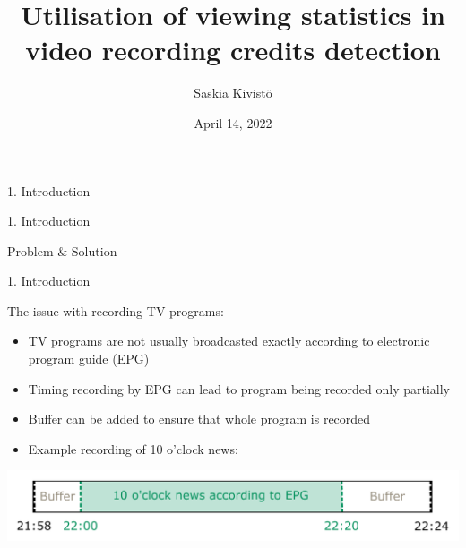 \documentclass[first=orange,second=blue,logo=blueque]{aaltoslides}
\title{Utilisation of viewing statistics in video recording credits detection}
\author[S. Kivistö]{Saskia Kivistö}
\institute[ICS]{Bachelor's thesis presentation}
\date{April 14, 2022}
\begin{document}

\aaltotitleframe


\begin{frame}{1. Introduction}
\end{frame}


\begin{frame}{1. Introduction}
    \begin{block}{{Problem {\color{black}\&} \alert{Solution }}}
    \end{block}
\end{frame}


\begin{frame}{1. Introduction}
    \begin{block}{{\color{black}The issue with recording TV programs:}}
        \begin{itemize}
            \item TV programs are not usually broadcasted exactly according to electronic program guide (EPG)
            \item Timing recording by EPG can lead to program being recorded only partially
            \item Buffer can be added to ensure that whole program is recorded
            \item Example recording of 10 o'clock news:
        \end{itemize}
        \center
        \includegraphics[width=1\textwidth]{figures/recording0.pdf}
    \end{block}
\end{frame}
    
\end{document}
